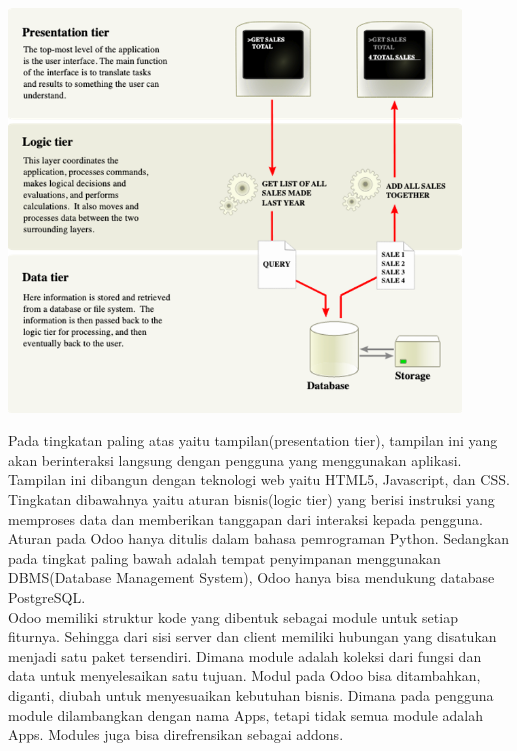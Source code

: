 \begin{center}
	\includegraphics[width=12cm]{img/arsitekturOdoo.PNG}
	\label{fig:asd}
\end{center}

Pada tingkatan paling atas yaitu tampilan(presentation tier), tampilan ini yang akan berinteraksi langsung dengan pengguna yang menggunakan aplikasi. Tampilan ini dibangun dengan teknologi web yaitu HTML5, Javascript, dan CSS. Tingkatan dibawahnya yaitu aturan bisnis(logic tier) yang berisi instruksi yang memproses data dan memberikan tanggapan dari interaksi kepada pengguna. Aturan pada Odoo hanya ditulis dalam bahasa pemrograman Python. Sedangkan pada tingkat paling bawah adalah tempat penyimpanan menggunakan DBMS(Database Management System), Odoo hanya bisa mendukung database PostgreSQL.\\

Odoo memiliki struktur kode yang dibentuk sebagai module untuk setiap fiturnya. Sehingga dari sisi server dan client memiliki hubungan yang disatukan menjadi satu paket tersendiri. Dimana module adalah koleksi dari fungsi dan data untuk menyelesaikan satu tujuan. Modul pada Odoo bisa ditambahkan, diganti, diubah untuk menyesuaikan kebutuhan bisnis. Dimana pada pengguna module dilambangkan dengan nama Apps, tetapi tidak semua module adalah Apps. Modules juga bisa direfrensikan sebagai addons.\\

